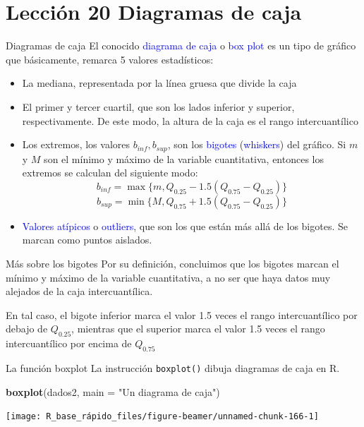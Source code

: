 \documentclass[
  ignorenonframetext,
  aspectratio=169]{beamer}
\newenvironment{Shaded}{\begin{snugshade}}{\end{snugshade}}
\newcommand{\AttributeTok}[1]{\textcolor[rgb]{0.13,0.29,0.53}{#1}}
\newcommand{\FunctionTok}[1]{\textcolor[rgb]{0.13,0.29,0.53}{\textbf{#1}}}
\newcommand{\NormalTok}[1]{#1}
\newcommand{\StringTok}[1]{\textcolor[rgb]{0.31,0.60,0.02}{#1}}
\providecommand{\tightlist}{%
  \setlength{\itemsep}{0pt}\setlength{\parskip}{0pt}}
\newcommand\blue[1]{\textcolor{blue}{#1}}
\begin{document}
\section{Lección 20 Diagramas de
caja}\label{lecciuxf3n-20-diagramas-de-caja}

\begin{frame}{Diagramas de caja}
\label{diagramas-de-caja}
El conocido \blue{diagrama de caja} o \blue{box plot} es un tipo de
gráfico que básicamente, remarca 5 valores estadísticos:

\begin{itemize}
\tightlist
\item
  La mediana, representada por la línea gruesa que divide la caja
\item
  El primer y tercer cuartil, que son los lados inferior y superior,
  respectivamente. De este modo, la altura de la caja es el rango
  intercuantílico
\item
  Los extremos, los valores \(b_{inf},b_{sup}\), son los \blue{bigotes}
  (\blue{whiskers}) del gráfico. Si \(m\) y \(M\) son el mínimo y máximo
  de la variable cuantitativa, entonces los extremos se calculan del
  siguiente modo: \[b_{inf}=\max\{m,Q_{0.25}-1.5(Q_{0.75}-Q_{0.25})\}\]
  \[b_{sup}=\min\{M,Q_{0.75}+1.5(Q_{0.75}-Q_{0.25})\}\]
\item
  \blue{Valores atípicos} o \blue{outliers}, que son los que están más
  allá de los bigotes. Se marcan como puntos aislados.
\end{itemize}
\end{frame}

\begin{frame}{Más sobre los bigotes}
\label{muxe1s-sobre-los-bigotes}
Por su definición, concluimos que los bigotes marcan el mínimo y máximo
de la variable cuantitativa, a no ser que haya datos muy alejados de la
caja intercuantílica.

En tal caso, el bigote inferior marca el valor 1.5 veces el rango
intercuantílico por debajo de \(Q_{0.25}\), mientras que el superior
marca el valor 1.5 veces el rango intercuantílico por encima de
\(Q_{0.75}\)
\end{frame}

\begin{frame}[fragile]{La función boxplot}
\label{la-funciuxf3n-boxplot}
La instrucción \texttt{boxplot()} dibuja diagramas de caja en R.

\begin{Shaded}
\begin{Highlighting}[]
\FunctionTok{boxplot}\NormalTok{(dados2, }\AttributeTok{main =} \StringTok{"Un diagrama de caja"}\NormalTok{)}
\end{Highlighting}
\end{Shaded}

\begin{center}\texttt{[image: R\_base\_rápido\_files/figure-beamer/unnamed-chunk-166-1]} \end{center}
\end{frame}
\end{document}
